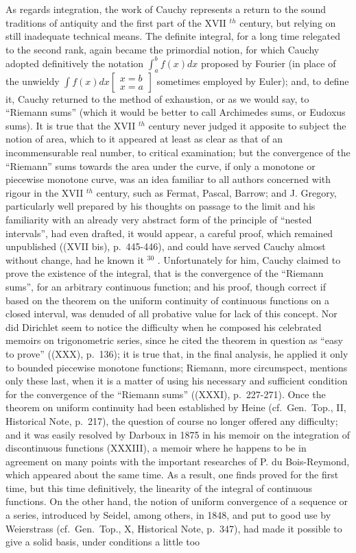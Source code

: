 As regards integration, the work of Cauchy represents a return to the sound traditions of antiquity and the first part of the XVII \(^{th}\) century, but relying on still inadequate technical means. The definite integral, for a long time relegated to the second rank, again became the primordial notion, for which Cauchy adopted definitively the notation \(\int_{a}^{b} f(x) dx\) proposed by Fourier (in place of the unwieldy \(\int f(x) dx \left[ \begin{array}{c} x = b \\ x = a \end{array} \right]\) sometimes employed by Euler); and, to define it, Cauchy returned to the method of exhaustion, or as we would say, to ``Riemann sums'' (which it would be better to call Archimedes sums, or Eudoxus sums). It is true that the XVII \(^{th}\) century never judged it apposite to subject the notion of area, which to it appeared at least as clear as that of an incommensurable real number, to critical examination; but the convergence of the ``Riemann'' sums towards the area under the curve, if only a monotone or piecewise monotone curve, was an idea familiar to all authors concerned with rigour in the XVII \(^{th}\) century, such as Fermat, Pascal, Barrow; and J. Gregory, particularly well prepared by his thoughts on passage to the limit and his familiarity with an already very abstract form of the principle of ``nested intervals'', had even drafted, it would appear, a careful proof, which remained unpublished ((XVII bis), p.~445-446), and could have served Cauchy almost without change, had he known it \(^{30}\) . Unfortunately for him, Cauchy claimed to prove the existence of the integral, that is the convergence of the ``Riemann sums'', for an arbitrary continuous function; and his proof, though correct if based on the theorem on the uniform continuity of continuous functions on a closed interval, was denuded of all probative value for lack of this concept. Nor did Dirichlet seem to notice the difficulty when he composed his celebrated memoirs on trigonometric series, since he cited the theorem in question as ``easy to prove'' ((XXX), p.~136); it is true that, in the final analysis, he applied it only to bounded piecewise monotone functions; Riemann, more circumspect, mentions only these last, when it is a matter of using his necessary and sufficient condition for the convergence of the ``Riemann sums'' ((XXXI), p.~227-271). Once the theorem on uniform continuity had been established by Heine (cf.~Gen.~Top., II, Historical Note, p.~217), the question of course no longer offered any difficulty; and it was easily resolved by Darboux in 1875 in his memoir on the integration of discontinuous functions (XXXIII), a memoir where he happens to be in agreement on many points with the important researches of P. du Bois-Reymond, which appeared about the same time. As a result, one finds proved for the first time, but this time definitively, the linearity of the integral of continuous functions. On the other hand, the notion of uniform convergence of a sequence or a series, introduced by Seidel, among others, in 1848, and put to good use by Weierstrass (cf.~Gen.~Top., X, Historical Note, p.~347), had made it possible to give a solid basis, under conditions a little too 